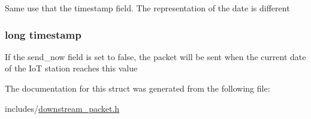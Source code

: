 Same use that the timestamp field. The representation of the date is different \hypertarget{structdownstream__packet_ac5deed89768140dbc80dbc6529a5e14a}{
\subsubsection[{timestamp}]{\setlength{\rightskip}{0pt plus 5cm}long timestamp}}\label{structdownstream__packet_ac5deed89768140dbc80dbc6529a5e14a}
If the send\-\_\-now field is set to false, the packet will be sent when the current date of the Io\-T station reaches this value 

The documentation for this struct was generated from the following file\-:\begin{DoxyCompactItemize}
\item 
includes/\hyperlink{downstream__packet_8h}{downstream\-\_\-packet.\-h}\end{DoxyCompactItemize}
